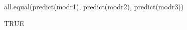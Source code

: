 \begin{Schunk}
\begin{Sinput}
 all.equal(predict(modr1), predict(modr2), predict(modr3))
\end{Sinput}
\begin{Soutput}
[1] TRUE
\end{Soutput}
\end{Schunk}
